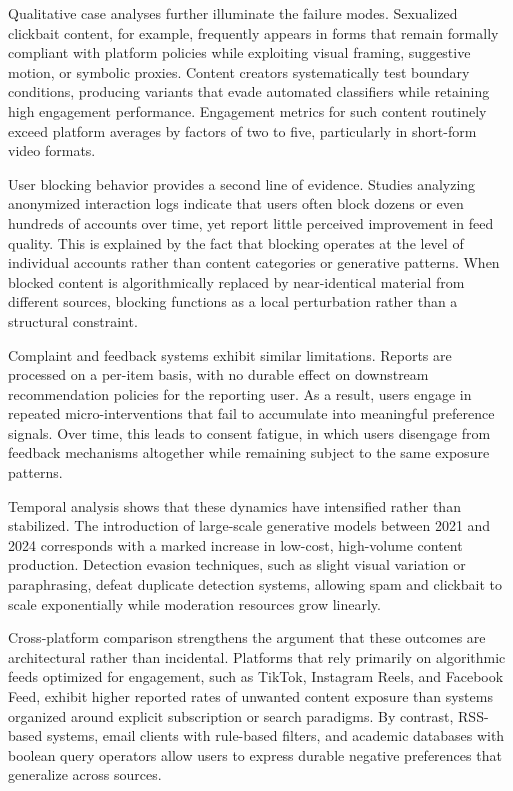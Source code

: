\documentclass[11pt,oneside]{article}
\begin{document}
Qualitative case analyses further illuminate the failure modes. Sexualized clickbait content, for example, frequently appears in forms that remain formally compliant with platform policies while exploiting visual framing, suggestive motion, or symbolic proxies. Content creators systematically test boundary conditions, producing variants that evade automated classifiers while retaining high engagement performance. Engagement metrics for such content routinely exceed platform averages by factors of two to five, particularly in short-form video formats.

User blocking behavior provides a second line of evidence. Studies analyzing anonymized interaction logs indicate that users often block dozens or even hundreds of accounts over time, yet report little perceived improvement in feed quality. This is explained by the fact that blocking operates at the level of individual accounts rather than content categories or generative patterns. When blocked content is algorithmically replaced by near-identical material from different sources, blocking functions as a local perturbation rather than a structural constraint.

Complaint and feedback systems exhibit similar limitations. Reports are processed on a per-item basis, with no durable effect on downstream recommendation policies for the reporting user. As a result, users engage in repeated micro-interventions that fail to accumulate into meaningful preference signals. Over time, this leads to consent fatigue, in which users disengage from feedback mechanisms altogether while remaining subject to the same exposure patterns.

Temporal analysis shows that these dynamics have intensified rather than stabilized. The introduction of large-scale generative models between 2021 and 2024 corresponds with a marked increase in low-cost, high-volume content production. Detection evasion techniques, such as slight visual variation or paraphrasing, defeat duplicate detection systems, allowing spam and clickbait to scale exponentially while moderation resources grow linearly.

Cross-platform comparison strengthens the argument that these outcomes are architectural rather than incidental. Platforms that rely primarily on algorithmic feeds optimized for engagement, such as TikTok, Instagram Reels, and Facebook Feed, exhibit higher reported rates of unwanted content exposure than systems organized around explicit subscription or search paradigms. By contrast, RSS-based systems, email clients with rule-based filters, and academic databases with boolean query operators allow users to express durable negative preferences that generalize across sources.
\end{document}
